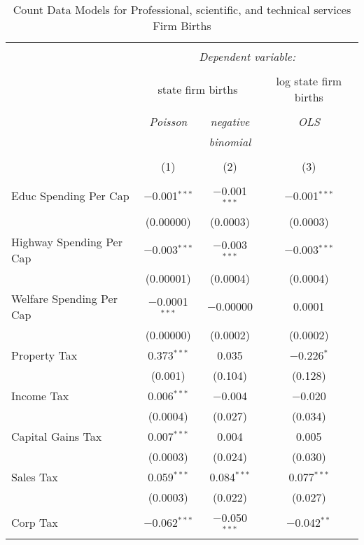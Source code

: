 
\begin{table}[!htbp] \centering 
  \caption{Count Data Models for Professional, scientific, and technical services Firm Births} 
  \label{} 
\begin{tabular}{@{\extracolsep{5pt}}lccc} 
\\[-1.8ex]\hline 
\hline \\[-1.8ex] 
 & \multicolumn{3}{c}{\textit{Dependent variable:}} \\ 
\cline{2-4} 
\\[-1.8ex] & \multicolumn{2}{c}{state firm births} & log state firm births \\ 
\\[-1.8ex] & \textit{Poisson} & \textit{negative} & \textit{OLS} \\ 
 & \textit{} & \textit{binomial} & \textit{} \\ 
\\[-1.8ex] & (1) & (2) & (3)\\ 
\hline \\[-1.8ex] 
 Educ Spending Per Cap & $-$0.001$^{***}$ & $-$0.001$^{***}$ & $-$0.001$^{***}$ \\ 
  & (0.00000) & (0.0003) & (0.0003) \\ 
  Highway Spending Per Cap  & $-$0.003$^{***}$ & $-$0.003$^{***}$ & $-$0.003$^{***}$ \\ 
  & (0.00001) & (0.0004) & (0.0004) \\ 
  Welfare Spending Per Cap  & $-$0.0001$^{***}$ & $-$0.00000 & 0.0001 \\ 
  & (0.00000) & (0.0002) & (0.0002) \\ 
  Property Tax & 0.373$^{***}$ & 0.035 & $-$0.226$^{*}$ \\ 
  & (0.001) & (0.104) & (0.128) \\ 
  Income Tax & 0.006$^{***}$ & $-$0.004 & $-$0.020 \\ 
  & (0.0004) & (0.027) & (0.034) \\ 
  Capital Gains Tax & 0.007$^{***}$ & 0.004 & 0.005 \\ 
  & (0.0003) & (0.024) & (0.030) \\ 
  Sales Tax & 0.059$^{***}$ & 0.084$^{***}$ & 0.077$^{***}$ \\ 
  & (0.0003) & (0.022) & (0.027) \\ 
  Corp Tax & $-$0.062$^{***}$ & $-$0.050$^{***}$ & $-$0.042$^{**}$ \\ 

\end{tabular}
\end{table}

